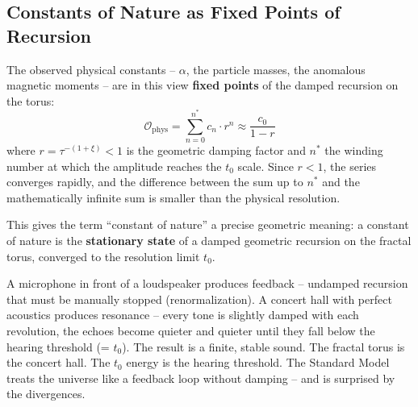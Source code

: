 	\begin{table}[h]
		\centering
		\caption{Loop diagrams in the SM vs.\ windings in T0}
		\label{tab:loops}
	\end{table}
	
	\subsection{Constants of Nature as Fixed Points of Recursion}
	
	The observed physical constants -- $\alpha$, the particle masses, the anomalous magnetic moments -- are in this view \textbf{fixed points} of the damped recursion on the torus:
	\begin{equation}
		\mathcal{O}_\text{phys} = \sum_{n=0}^{n^*} c_n \cdot r^n \approx \frac{c_0}{1 - r}
	\end{equation}
	where $r = \tau^{-(1+\xi)} < 1$ is the geometric damping factor and $n^*$ the winding number at which the amplitude reaches the $t_0$ scale. Since $r < 1$, the series converges rapidly, and the difference between the sum up to $n^*$ and the mathematically infinite sum is smaller than the physical resolution.
	
	This gives the term ``constant of nature'' a precise geometric meaning: a constant of nature is the \textbf{stationary state} of a damped geometric recursion on the fractal torus, converged to the resolution limit $t_0$.
	
	\begin{keypoint}
		A microphone in front of a loudspeaker produces feedback -- undamped recursion that must be manually stopped (renormalization). A concert hall with perfect acoustics produces resonance -- every tone is slightly damped with each revolution, the echoes become quieter and quieter until they fall below the hearing threshold (= $t_0$). The result is a finite, stable sound. The fractal torus is the concert hall. The $t_0$ energy is the hearing threshold. The Standard Model treats the universe like a feedback loop without damping -- and is surprised by the divergences.
	\end{keypoint}


